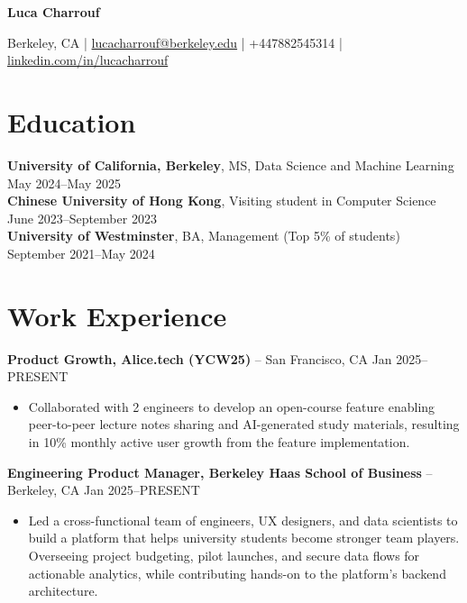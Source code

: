 \documentclass{article}
\begin{document}
\begin{center}
\textbf{\Large Luca Charrouf}

\vspace{0.1cm}
Berkeley, CA | \href{mailto:lucacharrouf@berkeley.edu}{lucacharrouf@berkeley.edu} | +447882545314 | \href{https://linkedin.com/in/lucacharrouf}{linkedin.com/in/lucacharrouf}
\end{center}

\section*{Education}
\textbf{University of California, Berkeley}, MS, Data Science and Machine Learning \hfill May 2024--May 2025 \\
\textbf{Chinese University of Hong Kong}, Visiting student in Computer Science \hfill June 2023--September 2023 \\
\textbf{University of Westminster}, BA, Management (Top 5\% of students) \hfill September 2021--May 2024

\section*{Work Experience}
\textbf{Product Growth, Alice.tech (YCW25)} -- San Francisco, CA \hfill Jan 2025--PRESENT
\begin{itemize}[leftmargin=*,noitemsep,topsep=0pt]
    \item Collaborated with 2 engineers to develop an open-course feature enabling peer-to-peer lecture notes sharing and AI-generated study materials, resulting in 10\% monthly active user growth from the feature implementation.
\end{itemize}

\textbf{Engineering Product Manager, Berkeley Haas School of Business} -- Berkeley, CA \hfill Jan 2025--PRESENT
\begin{itemize}[leftmargin=*,noitemsep,topsep=0pt]
    \item Led a cross-functional team of engineers, UX designers, and data scientists to build a platform that helps university students become stronger team players. Overseeing project budgeting, pilot launches, and secure data flows for actionable analytics, while contributing hands-on to the platform's backend architecture.
\end{itemize}
\end{document}

